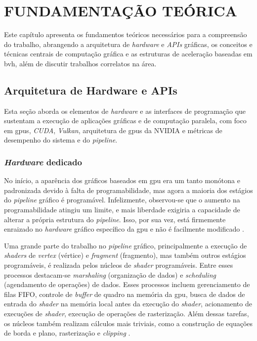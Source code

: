 \chapter{FUNDAMENTAÇÃO TEÓRICA}

Este capítulo apresenta os fundamentos teóricos necessários para a compreensão do trabalho, abrangendo a arquitetura de \textit{hardware} e \textit{APIs} gráficas, os conceitos e técnicas centrais de computação gráfica e as estruturas de aceleração baseadas em \gls{bvh}, além de discutir trabalhos correlatos na área.




\section{Arquitetura de Hardware e APIs}

Esta seção aborda os elementos de \textit{hardware} e as interfaces de programação que sustentam a execução de aplicações gráficas e de computação paralela, com foco em \glspl{gpu}, \textit{CUDA}, \textit{Vulkan}, arquitetura de \glspl{gpu} da NVIDIA e métricas de desempenho do sistema e do \textit{pipeline}.




\subsection{\textit{Hardware} dedicado}

No início, a aparência dos gráficos baseados em \gls{gpu} era um tanto monótona e padronizada devido à falta de programabilidade, mas agora a maioria dos estágios do \textit{pipeline} gráfico é programável. Infelizmente, observou-se que o aumento na programabilidade atingiu um limite, e mais liberdade exigiria a capacidade de alterar a própria estrutura do \textit{pipeline}. Isso, por sua vez, está firmemente enraizado no \textit{hardware} gráfico específico da \gls{gpu} e não é facilmente modificado \cite{laine2011high}.

Uma grande parte do trabalho no \textit{pipeline} gráfico, principalmente a execução de \textit{shaders} de \textit{vertex} (vértice) e \textit{fragment} (fragmento), mas também outros estágios programáveis, é realizada pelos núcleos de \textit{shader} programáveis. Entre esses processos destacam-se \textit{marshaling} (organização de dados) e \textit{scheduling} (agendamento de operações) de dados. Esses processos incluem gerenciamento de filas FIFO, controle de \textit{buffer} de quadro na memória da \gls{gpu}, busca de dados de entrada do \textit{shader} na memória local antes da execução do \textit{shader}, acionamento de execuções de \textit{shader}, execução de operações de rasterização. Além dessas tarefas, os núcleos também realizam cálculos mais triviais, como a construção de equações de borda e plano, rasterização e \textit{clipping} \cite{laine2011high}.

